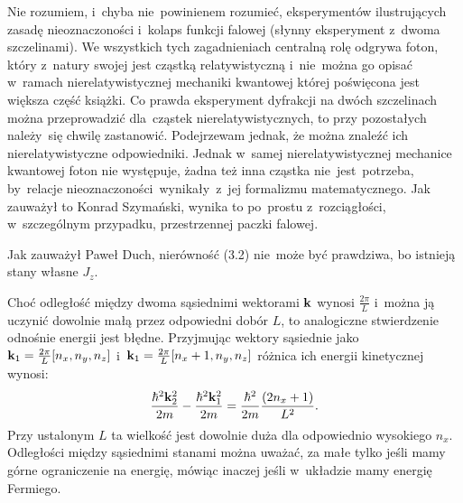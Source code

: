 \documentclass[a4paper,11pt]{article}
\begin{document}
\newpage


\vspace{0em}



\vspace{0em}


\noindent
Nie rozumiem, i~chyba nie~powinienem rozumieć, eksperymentów
ilustrujących zasadę nieoznaczoności i~kolaps funkcji falowej
(słynny eksperyment z~dwoma szczelinami). We wszystkich tych
zagadnieniach centralną rolę odgrywa foton, który z~natury swojej
jest cząstką relatywistyczną i~nie~można go opisać w~ramach
nierelatywistycznej mechaniki kwantowej której poświęcona jest
większa część książki. Co prawda eksperyment dyfrakcji na dwóch
szczelinach można przeprowadzić dla~cząstek nierelatywistycznych, to
przy pozostałych należy~się chwilę zastanowić. Podejrzewam jednak,
że można znaleźć ich nierelatywistyczne odpowiedniki. Jednak w~samej
nierelatywistycznej mechanice kwantowej foton nie występuje, żadna
też inna cząstka nie~jest~potrzeba, by~relacje
nieoznaczoności~wynikały~z~jej formalizmu matematycznego. Jak
zauważył to Konrad Szymański, wynika to po~prostu z~rozciągłości,
w~szczególnym przypadku, przestrzennej paczki falowej.

\vspace{\spaceFour}



\noindent
{} Jak zauważył Paweł Duch, nierówność (3.2)
nie~może być prawdziwa, bo istnieją stany własne $J_{ z }$.

\vspace{\spaceFour}



\noindent
{} Choć odległość między dwoma sąsiednimi
wektorami $\mathbf{k}$ wynosi $\frac{ 2 \pi }{ L }$ i~można ją
uczynić dowolnie małą przez odpowiedni dobór $L$, to analogiczne
stwierdzenie odnośnie energii jest błędne. Przyjmując wektory
sąsiednie jako
$\mathbf{k}_{ 1 } = \frac{ 2 \pi }{ L } [ n_{ x }, n_{ y }, n_{ z } ]$
i~$\mathbf{k}_{ 1 } = \frac{ 2 \pi }{ L } [ n_{ x } + 1, n_{ y }, n_{ z } ]$
różnica ich energii kinetycznej wynosi:
\begin{equation}
  \label{eq:Schiff-01}
  \frac{ \hbar^{ 2 } \mathbf{k}_{ 2 }^{ 2 } }{ 2 m }
  - \frac{ \hbar^{ 2 } \mathbf{k}_{ 1 }^{ 2 } }{ 2 m }
  = \frac{ \hbar^{ 2 } }{ 2 m } \frac{ ( 2 n_{ x } + 1 ) }{ L^{ 2 } }.
\end{equation}
Przy ustalonym $L$ ta wielkość jest dowolnie duża dla odpowiednio
wysokiego $n_{ x }$. Odległości między sąsiednimi stanami można
uważać, za małe tylko jeśli mamy górne ograniczenie na energię,
mówiąc inaczej jeśli w~układzie mamy energię Fermiego.
\end{document}

